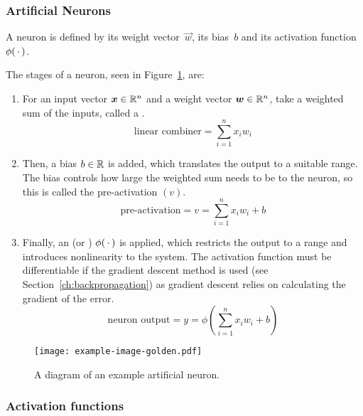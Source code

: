 \subsubsection{Artificial Neurons}
A neuron is defined by its weight vector~\(\vec{w}\), its bias~\(b\) and its activation function~\(\phi(\,\cdot\,)\).

The stages of a neuron, seen in Figure~\ref{fig:neuron-example}, are:
\begin{enumerate}
	\item For an input vector \(\bm{x} \in \mathbb{R}^n\) and a weight vector \(\bm{w} \in \mathbb{R}^n\), take a weighted sum of the inputs, called a .
	      \[ \text{linear combiner} = \sum_{i=1}^{n}{x_i w_i} \]
	\item Then, a bias \(b \in \mathbb{R}{}\) is added, which translates the output to a suitable range.
	      The bias controls how large the weighted sum needs to be to  the neuron, so this is called the pre-activation \((v)\).
	      \[ \text{pre-activation} = v = \sum_{i=1}^{n}{x_i w_i} + b \]
	\item Finally, an  (or ) \(\phi(\,\cdot\,)\) is applied, which restricts the output to a range and introduces nonlinearity to the system.
	      The activation function must be differentiable if the gradient descent method is used (see Section~\ref{ch:backpropagation}) as gradient descent relies on calculating the gradient of the error.
	      \[ \text{neuron output} = y = \phi\left(\sum_{i=1}^{n}{x_i w_i} + b \right) \]
\end{enumerate}

\begin{figure}[htbp]
	\centering
	\texttt{[image: example-image-golden.pdf]}
	\caption{A diagram of an example artificial neuron.}
	\label{fig:neuron-example}
\end{figure}

\subsubsection{Activation functions}

